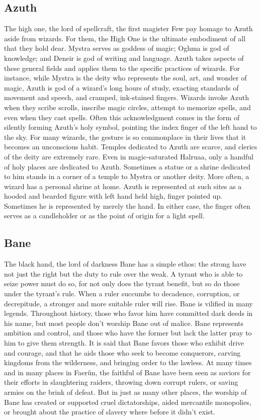 \documentclass[10pt,a4paper,twoside,twocolumn,openany,bg=print,nodeprecatedcode]{dndbook}
\begin{document}
\subsection{Azuth}
The high one, the lord of spellcraft, the first magister
Few pay homage to Azuth aside from wizards. For them, the High One is the ultimate embodiment of all that they hold dear.
Mystra serves as goddess of magic; Oghma is god of knowledge; and Deneir is god of writing and language. Azuth takes aspects of these general fields and applies them to the specific practices of wizards. For instance, while Mystra is the deity who represents the soul, art, and wonder of magic, Azuth is god of a wizard's long hours of study, exacting standards of movement and speech, and cramped, ink-stained fingers. Wizards invoke Azuth when they scribe scrolls, inscribe magic circles, attempt to memorize spells, and even when they cast spells. Often this acknowledgment comes in the form of silently forming Azuth's holy symbol, pointing the index finger of the left hand to the sky. For many wizards, the gesture is so commonplace in their lives that it becomes an unconscious habit.
Temples dedicated to Azuth are scarce, and clerics of the deity are extremely rare. Even in magic-saturated Halruaa, only a handful of holy places are dedicated to Azuth. Sometimes a statue or a shrine dedicated to him stands in a corner of a temple to Mystra or another deity. More often, a wizard has a personal shrine at home. Azuth is represented at such sites as a hooded and bearded figure with left hand held high, finger pointed up. Sometimes he is represented by merely the hand. In either case, the finger often serves as a candleholder or as the point of origin for a light spell.
\subsection{Bane}
The black hand, the lord of darkness
Bane has a simple ethos: the strong have not just the right but the duty to rule over the weak. A tyrant who is able to seize power must do so, for not only does the tyrant benefit, but so do those under the tyrant's rule. When a ruler succumbs to decadence, corruption, or decrepitude, a stronger and more suitable ruler will rise.
Bane is vilified in many legends. Throughout history, those who favor him have committed dark deeds in his name, but most people don't worship Bane out of malice. Bane represents ambition and control, and those who have the former but lack the latter pray to him to give them strength. It is said that Bane favors those who exhibit drive and courage, and that he aids those who seek to become conquerors, carving kingdoms from the wilderness, and bringing order to the lawless.
At many times and in many places in Faerûn, the faithful of Bane have been seen as saviors for their efforts in slaughtering raiders, throwing down corrupt rulers, or saving armies on the brink of defeat. But in just as many other places, the worship of Bane has created or supported cruel dictatorships, aided mercantile monopolies, or brought about the practice of slavery where before it didn't exist.
\end{document}
